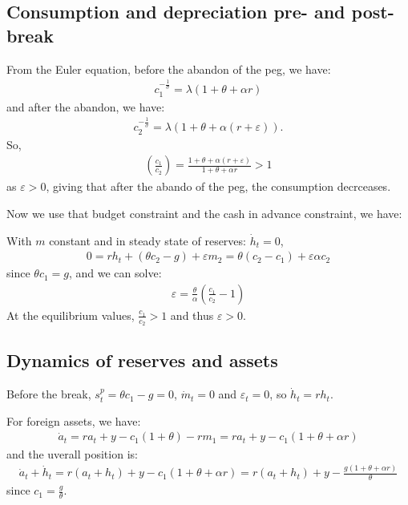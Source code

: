 \documentclass[a4paper,12pt]{article} %
\theoremstyle{nonitalic}
\begin{document}
\subsection{Consumption and depreciation pre- and post-break}\label{sec:1.3}
From the Euler equation, before the abandon of the peg, we have:
\begin{gather*}
    c_1^{-\frac{1}{\sigma}} = \lambda (1 + \theta + \alpha r)
\end{gather*}
and after the abandon, we have:
\begin{gather*}
    c_2^{-\frac{1}{\sigma}} = \lambda (1 + \theta + \alpha (r+\varepsilon)).
\end{gather*}
So,
\begin{gather*}
    \left(\frac{c_1}{c_2}\right) = \frac{1+\theta + \alpha (r+\varepsilon)}{1 + \theta + \alpha r} > 1
\end{gather*}
as $\varepsilon > 0$, giving that after the abando of the peg, the consumption decrceases.

Now we use that budget constraint and the cash in advance constraint, we have:

With $m$ constant and in steady state of reserves: $\dot{h}_t = 0$,
\begin{gather*}
    0 = r h_t + (\theta c_2 - g) + \varepsilon m_2 = \theta (c_2 - c_1 ) + \varepsilon \alpha c_2
\end{gather*}
since $\theta c_1 = g$, and we can solve:
\begin{gather*}
    \varepsilon  = \frac{\theta}{\alpha} \left( \frac{c_1}{c_2} - 1 \right)
\end{gather*}
At the equilibrium values, $\frac{c_1}{c_2} > 1$ and thus $\varepsilon > 0$.


\subsection{Dynamics of reserves and assets}\label{sec:1.4}
Before the break, $s_t^p = \theta c_1 - g = 0$, $\dot{m}_t = 0$ and $\varepsilon_t = 0$, so $\dot{h}_t = r h_t$.

For foreign assets, we have:
\begin{gather*}
    \dot{a}_t = r a_t + y - c_1(1+\theta) - r m_1 = r a_t + y - c_1 (1 + \theta + \alpha r)
\end{gather*}
and the uverall position is:
\begin{gather*}
    \dot{a}_t + \dot{h}_t = r(a_t + h_t) + y - c_1(1 + \theta + \alpha r) = r(a_t + h_t) + y - \frac{g (1 + \theta + \alpha r)}{\theta}
\end{gather*}
since $c_1 = \frac{g}{\theta}$.
\end{document}

